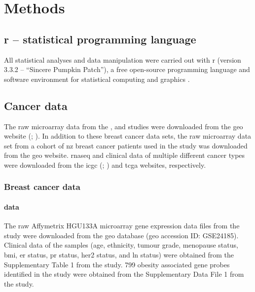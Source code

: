\chapter{Methods}
\label{ch:methods}

\section{\gls{r} -- statistical programming language}
\label{sec:r}

All statistical analyses and data manipulation were carried out with \gls{r} (version 3.3.2 -- ``Sincere Pumpkin Patch''), a free open-source programming language and software environment for statistical computing and graphics \citep{R2016}.

\section{Cancer data}
\label{sec:data}

The raw microarray data from the \citet{Creighton2012}, \citet{Fuentes-Mattei2014} and \citet{Gatza2010a}  studies were downloaded from the \gls{geo} website (\citealp{Edgar2002}; ).
In addition to these breast cancer data sets, the raw microarray data set from a cohort of \gls{nz} breast cancer patients used in the \citet{Print2016} study was downloaded from the \gls{geo} website.
\gls{rnaseq} and clinical data of multiple different cancer types were downloaded from the \gls{icgc} (; \citealp{Zhang2011}) and \gls{tcga}  websites, respectively.

\subsection{Breast cancer data}
\label{sub:breast_cancer_data}

\subsubsection{\citet{Creighton2012} data}
\label{ssub:creighton2012_data}

The raw Affymetrix HGU\-133A microarray gene expression data files from the \citet{Creighton2012} study were downloaded from the \gls{geo} database (\gls{geo} accession ID: GSE24185).
Clinical data of the samples (age, ethnicity, tumour grade, menopause status, \gls{bmi}, \gls{er} status, \gls{pr} status, \gls{her2} status, and \gls{ln} status) were obtained from the Supplementary Table 1 from the \citet{Creighton2012} study.
799 obesity associated gene probes identified in the \citet{Creighton2012} study were obtained from the Supplementary Data File 1 from the \citet{Creighton2012} study.

